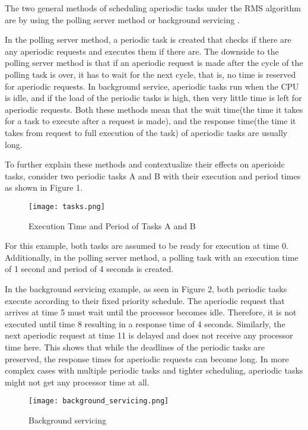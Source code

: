 \documentclass[conference]{IEEEtran}
\begin{document}
The two general methods of scheduling aperiodic tasks under the RMS algorithm are by using the polling server method or background servicing \cite{sprunt1990aperiodic}. 

In the polling server method, a periodic task is created that checks if there are any aperiodic requests and executes them if there are. The downside to the polling server method is that if an aperiodic request is made after the cycle of the polling task is over, it has to wait for the next cycle, that is, no time is reserved for aperiodic requests. In background service, aperiodic tasks run when the CPU is idle, and if the load of the periodic tasks is high, then very little time is left for aperiodic requests. Both these methods mean that the wait time(the time it takes for a task to execute after a request is made), and the response time(the time it takes from request to full execution of the task) of aperiodic tasks are usually long.


To further explain these methods and contextualize their effects on aperioidc tasks, consider two periodic tasks A and B with their execution and period times as shown in Figure 1. 

\begin{figure}[H]
  \centering
  \texttt{[image: tasks.png]} %
  \caption{Execution Time and Period of Tasks A and B}
\end{figure}

For this example, both tasks are assumed to be ready for execution at time 0. Additionally, in the polling server method, a polling task with an execution time of 1 second and period of 4 seconds is created. 

In the background servicing example, as seen in Figure 2, both periodic tasks execute according to their fixed priority schedule. The aperiodic request that arrives at time 5 must wait until the processor becomes idle. Therefore, it is not executed until time 8 resulting in a response time of 4 seconds. Similarly, the next aperiodic request at time 11 is delayed and does not receive any processor time here. 
This shows that while the deadlines of the periodic tasks are preserved, the response times for aperiodic requests  can become long. In more complex cases with multiple periodic tasks and tighter scheduling, aperiodic tasks might not get any processor time at all.
\begin{figure*}[!t]         %
  \centering
  \texttt{[image: background\_servicing.png]}
  \caption{Background servicing}
  \label{fig:background_servicing}
\end{figure*}
\end{document}
